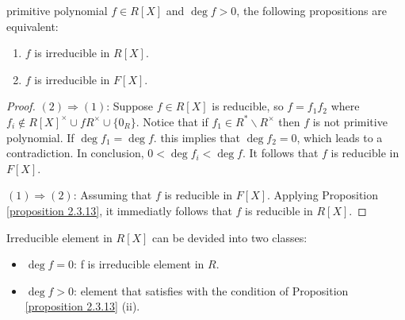 \begin{corollary}
    primitive polynomial $f \in R[X]$ and $\deg f > 0$, the following propositions are equivalent:
    \begin{enumerate}
        \item $f$ is irreducible in $R[X]$.
        \item $f$ is irreducible in $F[X]$.
    \end{enumerate}
\end{corollary}
\begin{proof}
    $(2) \Rightarrow (1)$: Suppose $f \in R[X]$ is reducible, so $f = f_1 f_2$ where $f_i \notin R[X]^{\times} \cup f R^{\times} \cup \{ 0_{R} \}$. Notice that if $f_1 \in R^* \smallsetminus R^{\times}$ then $f$ is not primitive polynomial. If $\deg f_1 = \deg f$. this implies that $\deg f_2 = 0$, which leads to a contradiction. In conclusion, $0 < \deg f_i < \deg f$. It follows that $f$ is reducible in $F[X]$.

    $(1) \Rightarrow (2)$: Assuming that $f$ is reducible in $F[X]$. Applying Proposition \ref{proposition 2.3.13}, it immediatly follows that $f$ is reducible in $R[X]$.
\end{proof}







\begin{corollary}
    Irreducible element in $R[X]$ can be devided into two classes:
    \begin{itemize}
        \item $\deg f = 0$: f is irreducible element in $R$.
        \item $\deg f > 0$: element that satisfies with the condition of Proposition \ref{proposition 2.3.13} (ii).
    \end{itemize}
\end{corollary}






